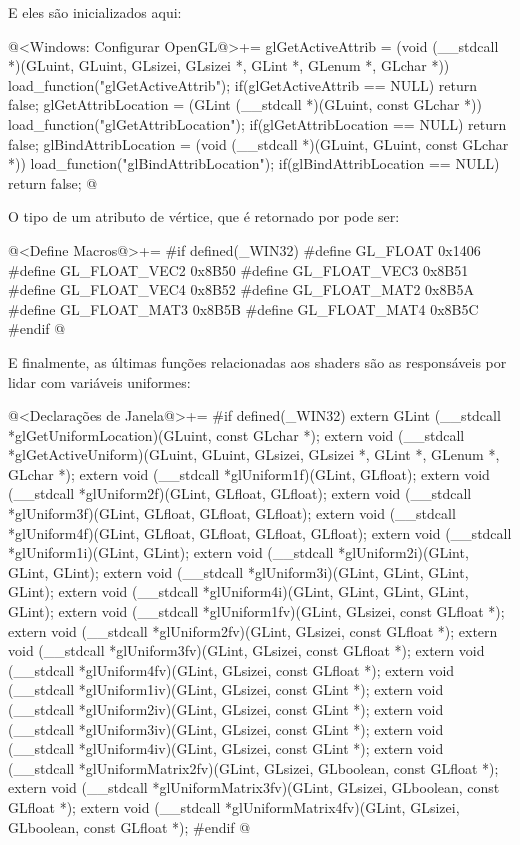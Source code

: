 E eles são inicializados aqui:

\iniciocodigo
@<Windows: Configurar OpenGL@>+=
glGetActiveAttrib = (void (__stdcall *)(GLuint, GLuint, GLsizei, GLsizei *,
                                        GLint *, GLenum *, GLchar *))
                    load_function("glGetActiveAttrib");
if(glGetActiveAttrib == NULL) return false;
glGetAttribLocation = (GLint (__stdcall *)(GLuint, const GLchar *))
                           load_function("glGetAttribLocation");
if(glGetAttribLocation == NULL) return false;
glBindAttribLocation = (void (__stdcall *)(GLuint, GLuint, const GLchar *))
                              load_function("glBindAttribLocation");
if(glBindAttribLocation == NULL) return false;
@
\fimcodigo

O tipo de um atributo de vértice, que é retornado
por  pode ser:

\iniciocodigo
@<Define Macros@>+=
#if defined(_WIN32)
#define GL_FLOAT      0x1406
#define GL_FLOAT_VEC2 0x8B50
#define GL_FLOAT_VEC3 0x8B51
#define GL_FLOAT_VEC4 0x8B52
#define GL_FLOAT_MAT2 0x8B5A
#define GL_FLOAT_MAT3 0x8B5B
#define GL_FLOAT_MAT4 0x8B5C
#endif
@
\fimcodigo

E finalmente, as últimas funções relacionadas aos shaders são as
responsáveis por lidar com variáveis uniformes:

\iniciocodigo
@<Declarações de Janela@>+=
#if defined(_WIN32)
extern GLint (__stdcall *glGetUniformLocation)(GLuint, const GLchar *);
extern void (__stdcall *glGetActiveUniform)(GLuint, GLuint, GLsizei, GLsizei *,
                                            GLint *, GLenum *, GLchar *);
extern void (__stdcall *glUniform1f)(GLint, GLfloat);
extern void (__stdcall *glUniform2f)(GLint, GLfloat, GLfloat);
extern void (__stdcall *glUniform3f)(GLint, GLfloat, GLfloat, GLfloat);
extern void (__stdcall *glUniform4f)(GLint, GLfloat, GLfloat, GLfloat, GLfloat);
extern void (__stdcall *glUniform1i)(GLint, GLint);
extern void (__stdcall *glUniform2i)(GLint, GLint, GLint);
extern void (__stdcall *glUniform3i)(GLint, GLint, GLint, GLint);
extern void (__stdcall *glUniform4i)(GLint, GLint, GLint, GLint, GLint);
extern void (__stdcall *glUniform1fv)(GLint, GLsizei, const GLfloat *);
extern void (__stdcall *glUniform2fv)(GLint, GLsizei, const GLfloat *);
extern void (__stdcall *glUniform3fv)(GLint, GLsizei, const GLfloat *);
extern void (__stdcall *glUniform4fv)(GLint, GLsizei, const GLfloat *);
extern void (__stdcall *glUniform1iv)(GLint, GLsizei, const GLint *);
extern void (__stdcall *glUniform2iv)(GLint, GLsizei, const GLint *);
extern void (__stdcall *glUniform3iv)(GLint, GLsizei, const GLint *);
extern void (__stdcall *glUniform4iv)(GLint, GLsizei, const GLint *);
extern void (__stdcall *glUniformMatrix2fv)(GLint, GLsizei, GLboolean,
                                            const GLfloat *);
extern void (__stdcall *glUniformMatrix3fv)(GLint, GLsizei, GLboolean,
                                            const GLfloat *);
extern void (__stdcall *glUniformMatrix4fv)(GLint, GLsizei, GLboolean,
                                            const GLfloat *);
#endif
@
\fimcodigo

